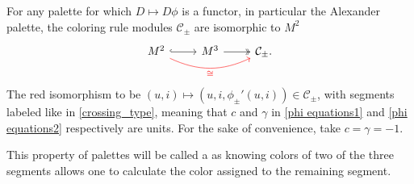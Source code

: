 \begin{example}
\begin{center}
  \end{center}
\end{example}


For any palette for which $D\mapsto D\phi$ is a functor, in particular the Alexander palette, 
the coloring rule modules $\mathcal{C}_\pm$ are isomorphic to $M^2$
    $$
    \begin{tikzcd}
      M^2 \arrow[r, hookrightarrow] \arrow[rr, bend right=25, red, "\cong" below] & M^3 \arrow[twoheadrightarrow, r] & \mathcal{C}_\pm.
    \end{tikzcd}
    $$
The red isomorphism to be $(u, i)\mapsto (u, i, \phi_\pm'(u, i))\in\mathcal{C}_\pm$, with segments labeled like in \cref{crossing_type}, meaning that $c$ and $\gamma$ in \eqref{phi equations1} and \eqref{phi equations2} respectively are units. For the sake of convenience, take $c=\gamma=-1$.

    This property of palettes will be called a  as knowing colors of two of the three segments allows one to calculate the color assigned to the remaining segment.

